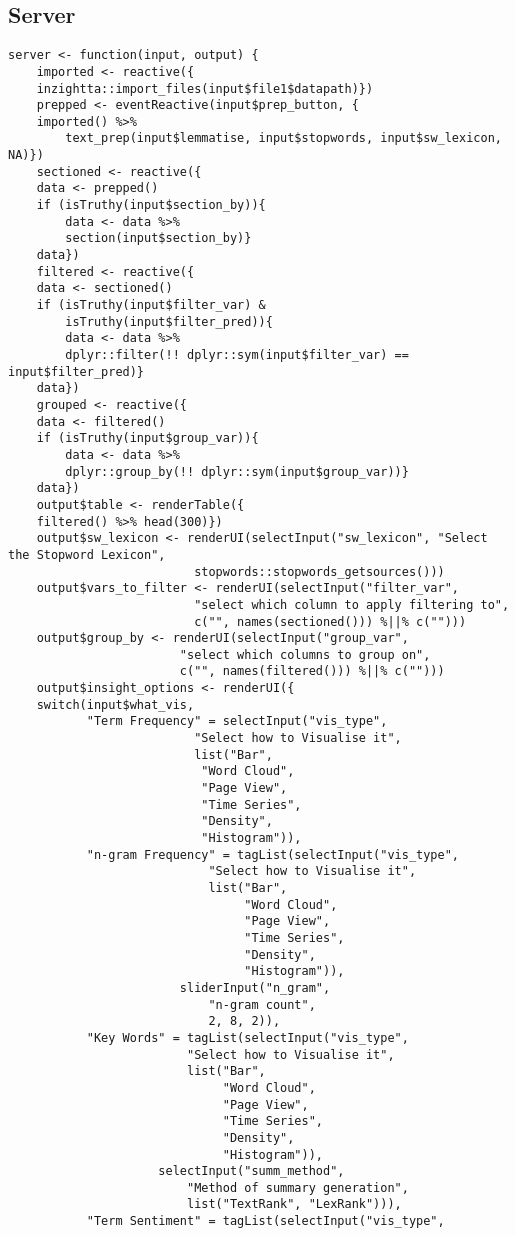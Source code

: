 \documentclass[a4paper, 11pt]{article}
\begin{document}
\subsection{Server}
\label{sec:org7a91f94}
\begin{verbatim}
server <- function(input, output) {
    imported <- reactive({
	inzightta::import_files(input$file1$datapath)})
    prepped <- eventReactive(input$prep_button, {
	imported() %>%
	    text_prep(input$lemmatise, input$stopwords, input$sw_lexicon, NA)})
    sectioned <- reactive({
	data <- prepped()
	if (isTruthy(input$section_by)){
	    data <- data %>%
		section(input$section_by)}
	data})
    filtered <- reactive({
	data <- sectioned()
	if (isTruthy(input$filter_var) &
	    isTruthy(input$filter_pred)){
	    data <- data %>%
		dplyr::filter(!! dplyr::sym(input$filter_var) == input$filter_pred)}
	data})
    grouped <- reactive({
	data <- filtered()
	if (isTruthy(input$group_var)){
	    data <- data %>%
		dplyr::group_by(!! dplyr::sym(input$group_var))}
	data})
    output$table <- renderTable({
	filtered() %>% head(300)})
    output$sw_lexicon <- renderUI(selectInput("sw_lexicon", "Select the Stopword Lexicon",
					      stopwords::stopwords_getsources()))
    output$vars_to_filter <- renderUI(selectInput("filter_var",
						  "select which column to apply filtering to",
						  c("", names(sectioned())) %||% c("")))
    output$group_by <- renderUI(selectInput("group_var",
					    "select which columns to group on",
					    c("", names(filtered())) %||% c("")))
    output$insight_options <- renderUI({
	switch(input$what_vis,
	       "Term Frequency" = selectInput("vis_type",
					      "Select how to Visualise it",
					      list("Bar",
						   "Word Cloud",
						   "Page View",
						   "Time Series",
						   "Density",
						   "Histogram")),
	       "n-gram Frequency" = tagList(selectInput("vis_type",
							"Select how to Visualise it",
							list("Bar",
							     "Word Cloud",
							     "Page View",
							     "Time Series",
							     "Density",
							     "Histogram")),
					    sliderInput("n_gram",
							"n-gram count",
							2, 8, 2)),
	       "Key Words" = tagList(selectInput("vis_type",
						 "Select how to Visualise it",
						 list("Bar",
						      "Word Cloud",
						      "Page View",
						      "Time Series",
						      "Density",
						      "Histogram")),
				     selectInput("summ_method",
						 "Method of summary generation",
						 list("TextRank", "LexRank"))),
	       "Term Sentiment" = tagList(selectInput("vis_type",

\end{verbatim}
\end{document}
